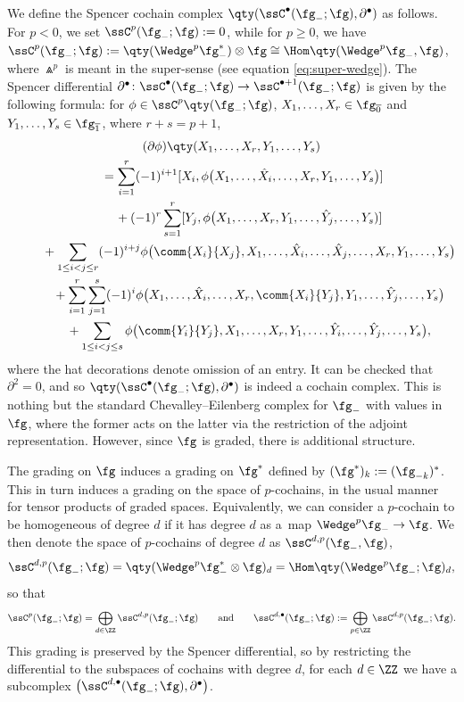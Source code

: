 We define the Spencer cochain complex $\qty(\ssC^\bullet(\fg_-;\fg),\partial^\bullet)$ as follows. For $p<0$, we set $\ssC^p(\fg_-;\fg)\allowbreak:=0$, while for $p\geq 0$, we have
$\ssC^p(\fg_-;\fg) := \qty(\Wedge^p \fg_-^*) \otimes \fg \cong \Hom\qty(\Wedge^p \fg_-,\fg)$,
where $\Wedge^p$ is meant in the super-sense (see equation \eqref{eq:super-wedge}). The Spencer differential $\partial^\bullet\colon \ssC^\bullet(\fg_-;\fg)\to \ssC^{\bullet+1}(\fg_-;\fg)$ is given by the following formula: for $\phi\in \ssC^p\qty(\fg_-;\fg)$, $X_1,\dots, X_r\in\fg_{\overline{0}}$ and $Y_1,\dots,Y_s\in\fg_{\overline{1}}$, where $r+s=p+1$,
\begin{gather}
	(\partial\phi)\qty(X_1,\dots,X_r,Y_1,\dots,Y_s)\nonumber\\
\qquad	= \sum_{i=1}^r (-1)^{i+1} [X_i,\phi\bigl(X_1,\dots,\hat{X}_i,\dots,X_r,Y_1,\dots,Y_s\bigr)]	\nonumber\\
\phantom{\qquad=}{}+ (-1)^{r} \sum_{s=1}^r [Y_j,\phi \bigl(X_1,\dots,X_r,Y_1,\dots,\hat{Y}_j,\dots,Y_s)]\nonumber	\\
\phantom{\qquad=}{}+ \sum_{1\leq i<j\leq r} (-1)^{i+j} \phi \bigl(\comm{X_i}{X_j},X_1,\dots,\hat{X}_i,\dots,\hat{X}_j,\dots,X_r,Y_1,\dots,Y_s\bigr)\nonumber	\\
\phantom{\qquad=}{}+ \sum_{i=1}^r\sum_{j=1}^s (-1)^{i} \phi \bigl(X_1,\dots,\hat{X}_i,\dots,X_r,\comm{X_i}{Y_j},Y_1,\dots,\hat{Y}_j,\dots,Y_s\bigr)	\nonumber\\
\phantom{\qquad=}{}+ \sum_{1\leq i<j\leq s} \phi \bigl(\comm{Y_i}{Y_j},X_1,\dots,X_r,Y_1,\dots,\hat{Y}_i,\dots,\hat{Y}_j,\dots,Y_s\bigr),\label{eq:CEdiffLiesuper}
\end{gather}
where the hat decorations denote omission of an entry. It can be checked that $\partial^2=0$, and so $\qty(\ssC^\bullet(\fg_-;\fg),\partial^\bullet)$ is indeed a cochain complex. This is nothing but the standard Chevalley--Eilenberg complex for $\fg_-$ with values in $\fg$, where the former acts on the latter via the restriction of the adjoint representation. However, since $\fg$ is graded, there is additional structure.

The grading on $\fg$ induces a grading on $\fg^*$ defined by $(\fg^*)_k:=(\fg_{-k})^*$. This in turn induces a grading on the space of $p$-cochains, in the usual manner for tensor products of graded spaces. Equivalently, we can consider a $p$-cochain to be homogeneous of degree $d$ if it has degree $d$ as a~map $\Wedge^p \fg_-\to\fg$. We then denote the space of $p$-cochains of degree $d$ as $\ssC^{d,p}(\fg_-,\fg)$,
\begin{equation}\label{eq:spencer-complex-grading}
	\ssC^{d,p}(\fg_-;\fg) = \qty(\Wedge^p \fg_-^*\otimes \fg)_d = \Hom\qty(\Wedge^p \fg_-;\fg)_d,
\end{equation}
so that
\[
	\ssC^p(\fg_-;\fg) = \bigoplus_{d\in\ZZ} \ssC^{d,p}(\fg_-;\fg) \qquad\text{and} \qquad\ssC^{d,\bullet}(\fg_-;\fg) := \bigoplus_{p\in\ZZ} \ssC^{d,p}(\fg_-;\fg).
\]
This grading is preserved by the Spencer differential, so by restricting the differential to the subspaces of cochains with degree $d$, for each $d\in\ZZ$ we have a subcomplex $\bigl(\ssC^{d,\bullet}(\fg_-;\fg),\partial^\bullet\bigr)$.

